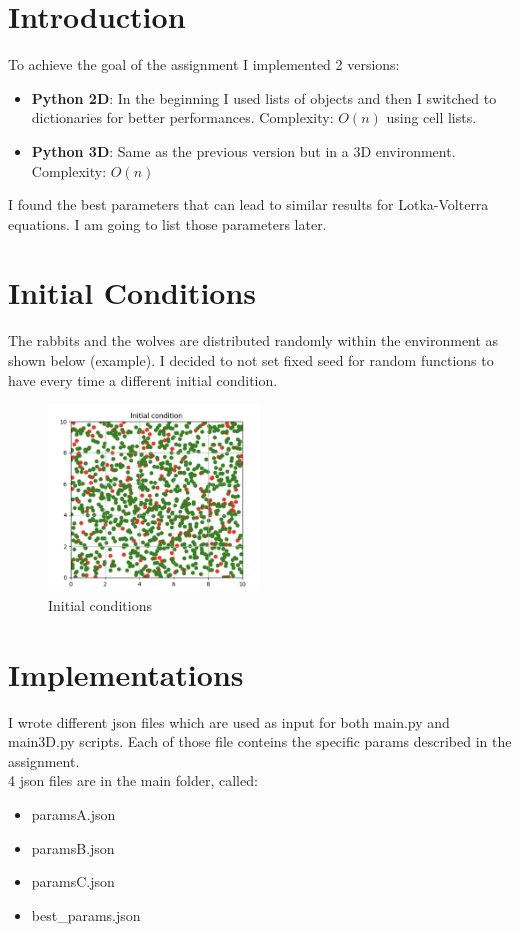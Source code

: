 \documentclass[unicode,11pt,a4paper,oneside,numbers=endperiod,openany]{scrartcl}
\begin{document}
\setassignment

\newline
\section*{Introduction}
To achieve the goal of the assignment I implemented 2 versions:
\begin{itemize}
  \item \textbf{Python 2D}: In the beginning I used lists of objects and then I switched to dictionaries for better performances. Complexity: $O(n)$ using cell lists. 
  \item \textbf{Python 3D}: Same as the previous version but in a 3D environment. Complexity: $O(n)$
\end{itemize}
I found the best parameters that can lead to similar results for Lotka-Volterra equations. I am going to list those parameters later. \\

\section*{Initial Conditions}
The rabbits and the wolves are distributed randomly within the environment as shown below (example). I decided to not set fixed seed for random functions
to have every time a different initial condition.
\begin{figure}[H]
  \centering
  \includegraphics[width=0.5\textwidth]{output_main/Initial_condition.png}
  \caption{Initial conditions}
\end{figure}
\section*{Implementations}
I wrote different json files which are used as input for both main.py and main3D.py scripts. Each of those file conteins the specific params described in the assignment. \\
4 json files are in the main folder, called:
\begin{itemize}
  \item paramsA.json
  \item paramsB.json
  \item paramsC.json
  \item best\_params.json
  
\end{itemize}
\end{document}
